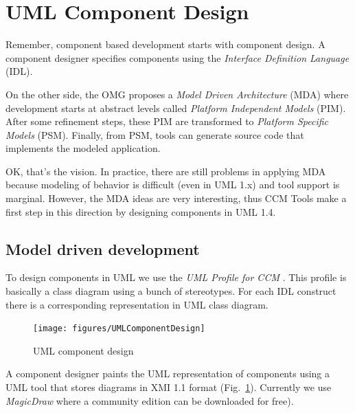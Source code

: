 \section{UML Component Design}
\label{UMLComponentDesign}

Remember, component based development starts with component design.
A component designer specifies components using the 
{\it Interface Definition Language} (IDL).

On the other side, the OMG proposes a {\it Model Driven Architecture} (MDA) 
where development starts at abstract levels called 
{\it Platform Independent Models} (PIM).
After some refinement steps, these PIM are transformed to 
{\it Platform Specific Models} (PSM).
Finally, from PSM, tools can generate source code that implements the modeled 
application.

OK, that's the vision. 
In practice, there are still problems in applying MDA because modeling of 
behavior is difficult (even in UML 1.x) and tool support is marginal. 
However, the MDA ideas are very interesting, thus CCM Tools make a first step 
in this direction by designing components in UML 1.4.

\subsection{Model driven development}

To design components in UML we use the {\it UML Profile for CCM} 
\cite{UML-CORBA-Profile,UML-CCM-Profile}. 
This profile is basically a class diagram using a bunch of stereotypes.
For each IDL construct there is a corresponding representation in UML class 
diagram.

\begin{figure}[htb]
    \begin{center}
        \texttt{[image: figures/UMLComponentDesign]}
        \caption{UML component design}
        \label{fig:uml-component-design}
    \end{center}
\end{figure}

A component designer paints the UML representation of components using a UML 
tool that stores diagrams in XMI 1.1 format 
(Fig.~\ref{fig:uml-component-design}).
Currently we use {\it MagicDraw} where a community edition can be downloaded 
for free).

